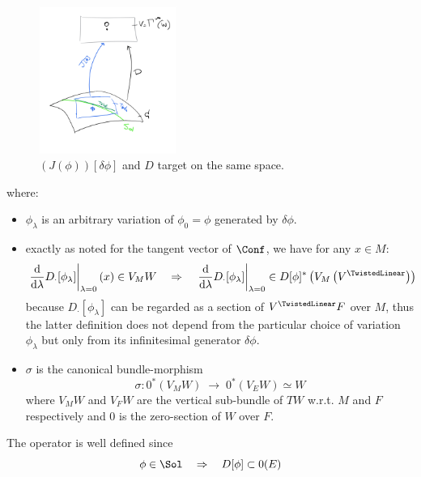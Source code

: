 \documentclass[a4paper,12pt]{scrartcl}  %
\begin{document}
\begin{figure}
\centering
\includegraphics[width=0.40\textwidth]{Pictures/Jacobi.png}
\caption{\footnotesize \label{fig:jacobi}$ \left(J(\phi)\right) [ \delta\phi ]$ and $D$ target on the same space.}
\end{figure}
where:
\begin{itemize}
	\item $\phi_\lambda$ is an arbitrary variation of $\phi_0 = \phi$ generated by $\delta\phi$.
	\item exactly as noted for the tangent vector of $\Conf$, we have for any $x\in M$:
		\begin{displaymath}
			\left.\dfrac{\textrm{d}}{\textrm{d} \lambda} D_\cdot [\phi_\lambda]\right\rvert_{\lambda=0}(x) \in V_M W
			\quad \Rightarrow \quad
			\left.\dfrac{\textrm{d}}{\textrm{d} \lambda} D_\cdot [\phi_\lambda]\right\rvert_{\lambda=0} \in D[\phi]^\ast \left( V_M \left( V^\TwistedLinear \right)\right)
		\end{displaymath}
		because $D_\cdot[\phi_\lambda]$ can be regarded as a section of $V^\TwistedLinear F$ over $M$, 
		thus the latter definition does not depend from the particular choice of variation $\phi_\lambda$ 
		but only from its infinitesimal generator $\delta\phi$.
	\item $\sigma$ is the canonical bundle-morphism
		\begin{displaymath}
			\sigma:  0^\ast \left( V_M W \right)  \; \rightarrow \;  0^\ast \left(V_E W \right) \simeq W
		\end{displaymath}
		 where $V_M W$ and $V_F W$ are the vertical sub-bundle of $T W$ w.r.t. $M$ and $F$ respectively 
		 and $0$ is the zero-section of $W$ over $F$.
\end{itemize}

The operator is well defined since
\begin{displaymath}
	\phi \in \Sol \quad \Rightarrow \quad D[\phi] \subset 0(E)
\end{displaymath}
\end{document}
